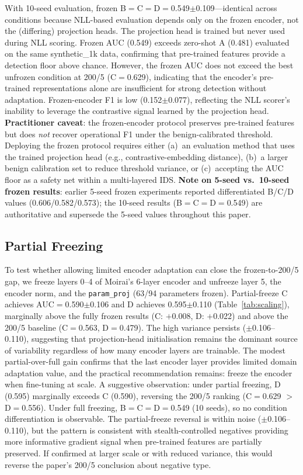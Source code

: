 With 10-seed evaluation, frozen B$=$C$=$D$=$0.549$\pm$0.109---identical
across conditions because NLL-based evaluation depends only on the frozen
encoder, not the (differing) projection heads.  The projection head is
trained but never used during NLL scoring.
Frozen AUC (0.549) exceeds zero-shot A (0.481) evaluated on the same
synthetic\_1k data, confirming that pre-trained features provide a
detection floor above chance.  However, the frozen AUC does not exceed
the best unfrozen condition at 200/5 (C$=$0.629), indicating that the
encoder's pre-trained representations alone are insufficient for strong
detection without adaptation.
Frozen-encoder F1 is low (0.152$\pm$0.077), reflecting the
NLL scorer's inability to leverage the contrastive signal learned by the
projection head.
\textbf{Practitioner caveat}: the frozen-encoder protocol preserves
pre-trained features but does \emph{not} recover operational F1 under
the benign-calibrated threshold.  Deploying the frozen protocol requires
either (a)~an evaluation method that uses the trained projection head
(e.g., contrastive-embedding distance), (b)~a larger benign calibration
set to reduce threshold variance, or (c)~accepting the AUC floor as a
safety net within a multi-layered IDS.
\textbf{Note on 5-seed vs.\ 10-seed frozen results}: earlier 5-seed
frozen experiments reported differentiated B/C/D values (0.606/0.582/0.573);
the 10-seed results (B$=$C$=$D$=$0.549) are authoritative and supersede
the 5-seed values throughout this paper.

\subsection{Partial Freezing}
\label{app:partial_freeze}

To test whether allowing limited encoder adaptation can close the
frozen-to-200/5 gap, we freeze layers 0--4 of Moirai's 6-layer
encoder and unfreeze layer 5, the encoder norm, and the
\texttt{param\_proj} (63/94 parameters frozen).
Partial-freeze C achieves AUC$=$0.590$\pm$0.106 and
D achieves 0.595$\pm$0.110 (Table~\ref{tab:scaling}),
marginally above the fully frozen results
(C: $+$0.008, D: $+$0.022) and above the 200/5 baseline
(C$=$0.563, D$=$0.479).
The high variance persists ($\pm$0.106--0.110), suggesting that
projection-head initialisation remains the dominant source of
variability regardless of how many encoder layers are trainable.
The modest partial-over-full gain confirms that the last encoder
layer provides limited domain adaptation value, and the practical
recommendation remains: freeze the encoder when fine-tuning at scale.
A suggestive observation: under partial freezing, D (0.595) marginally
exceeds C (0.590), reversing the 200/5 ranking (C$=$0.629 $>$ D$=$0.556).
Under full freezing, B$=$C$=$D$=$0.549 (10 seeds), so no condition
differentiation is observable.  The partial-freeze reversal is within
noise ($\pm$0.106--0.110), but the pattern is consistent with
stealth-controlled negatives providing more informative gradient signal
when pre-trained features are partially preserved.
If confirmed at larger scale or with reduced variance, this would
reverse the paper's 200/5 conclusion about negative type.

